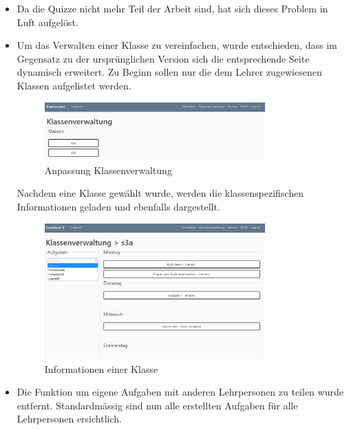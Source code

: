 \begin{itemize}
	\item Da die Quizze nicht mehr Teil der Arbeit sind, hat sich dieses Problem in Luft aufgelöst.
	\newpage
	\item Um das Verwalten einer Klasse zu vereinfachen, wurde entschieden, dass im Gegensatz zu der ursprünglichen Version sich die entsprechende Seite dynamisch erweitert. Zu Beginn sollen nur die dem Lehrer zugewiesenen Klassen aufgelistet werden. \\
	
	\begin{figure}[H]
	\begin{center}
	
		\includegraphics[width=0.8\textwidth, height=\textheight, keepaspectratio]{images/Webseite/Klassenverwaltung_Desktop.png}
		\caption{Anpassung Klassenverwaltung}
		\end{center}
\end{figure}

Nachdem eine Klasse gewählt wurde, werden die klassenspezifischen Informationen geladen und ebenfalls dargestellt. \\

	\begin{figure}[H]
				\begin{center}
\includegraphics[width=0.8\textwidth, height=\textheight, keepaspectratio]{images/Webseite/Klassenverwaltung_Klasse_Desktop.png}
		\caption{Informationen einer Klasse}
		\end{center}
\end{figure}

\bigskip

	\item Die Funktion um eigene Aufgaben mit anderen Lehrpersonen zu teilen wurde entfernt. Standardmässig sind nun alle erstellten Aufgaben für alle Lehrpersonen ersichtlich.
\end{itemize}

